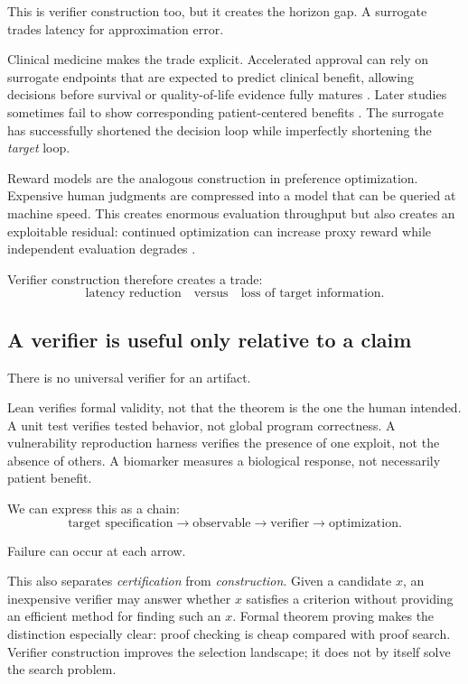 This is verifier construction too, but it creates the horizon gap.  A surrogate
trades latency for approximation error.

Clinical medicine makes the trade explicit.  Accelerated approval can rely on
surrogate endpoints that are expected to predict clinical benefit, allowing decisions
before survival or quality-of-life evidence fully matures
\parencite{gyawali2019accelerated,naci2017accelerated}.  Later studies sometimes fail to
show corresponding patient-centered benefits
\parencite{liu2024clinicalbenefit}.  The surrogate has successfully shortened the
decision loop while imperfectly shortening the \emph{target} loop.

Reward models are the analogous construction in preference optimization.  Expensive
human judgments are compressed into a model that can be queried at machine speed.
This creates enormous evaluation throughput but also creates an exploitable residual:
continued optimization can increase proxy reward while independent evaluation
degrades \parencite{gao2022overoptimization,rafailov2024direct}.

Verifier construction therefore creates a trade:
\[
    \text{latency reduction}
    \quad\text{versus}\quad
    \text{loss of target information}.
\]

\subsection{A verifier is useful only relative to a claim}

There is no universal verifier for an artifact.

Lean verifies formal validity, not that the theorem is the one the human intended.
A unit test verifies tested behavior, not global program correctness.
A vulnerability reproduction harness verifies the presence of one exploit, not the
absence of others.
A biomarker measures a biological response, not necessarily patient benefit.

We can express this as a chain:
\[
\boxed{
\text{target specification}
\rightarrow
\text{observable}
\rightarrow
\text{verifier}
\rightarrow
\text{optimization}.
}
\]

Failure can occur at each arrow.

This also separates \emph{certification} from \emph{construction}.  Given a candidate
\(x\), an inexpensive verifier may answer whether \(x\) satisfies a criterion without
providing an efficient method for finding such an \(x\).  Formal theorem proving
makes the distinction especially clear: proof checking is cheap compared with proof
search.  Verifier construction improves the selection landscape; it does not by
itself solve the search problem.

